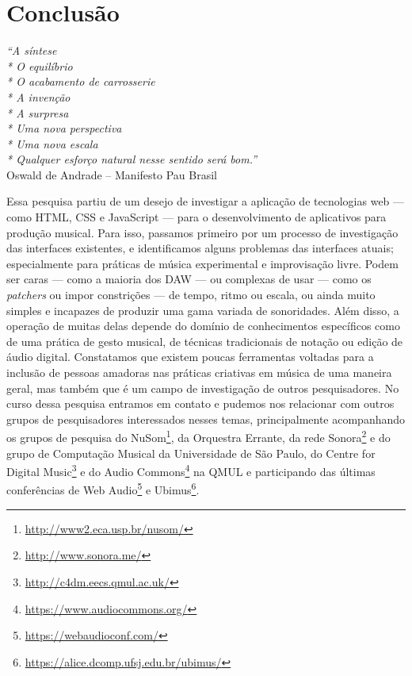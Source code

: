 
\chapter{Conclusão}
\label{ch:conclusao}
\begin{flushright}
\textit{``A síntese\\*
O equilíbrio\\*
O acabamento de carrosserie\\*
A invenção\\*
A surpresa\\*
Uma nova perspectiva\\*
Uma nova escala\\*
Qualquer esforço natural nesse sentido será bom.''} \\
Oswald de Andrade – Manifesto Pau Brasil    
\end{flushright}



Essa pesquisa partiu de um desejo de investigar a aplicação de tecnologias web --- como HTML, CSS e JavaScript --- para o desenvolvimento de aplicativos para produção musical. Para isso, passamos primeiro por um processo de investigação das interfaces existentes, e identificamos alguns problemas das interfaces atuais; especialmente para práticas de música experimental e improvisação livre. Podem ser caras --- como a maioria dos DAW --- ou complexas de usar --- como os \emph{patchers} ou impor constrições --- de tempo, ritmo ou escala, ou ainda muito simples e incapazes de produzir uma gama variada de sonoridades. Além disso, a operação de muitas delas depende do domínio de conhecimentos específicos como de uma prática de gesto musical, de técnicas tradicionais de notação ou edição de áudio digital. Constatamos que existem poucas ferramentas voltadas para a inclusão de pessoas amadoras nas práticas criativas em música de uma maneira geral, mas também que é um campo de investigação de outros pesquisadores. No curso dessa pesquisa entramos em contato e pudemos nos relacionar com outros grupos de pesquisadores interessados nesses temas, principalmente acompanhando os grupos de pesquisa do NuSom\footnote{\url{http://www2.eca.usp.br/nusom/}}, da Orquestra Errante, da rede Sonora\footnote{\url{http://www.sonora.me/}} e do grupo de Computação Musical da Universidade de São Paulo, do Centre for Digital Music\footnote{\url{http://c4dm.eecs.qmul.ac.uk/}} e do Audio Commons\footnote{\url{https://www.audiocommons.org/}} na QMUL e participando das últimas conferências de Web Audio\footnote{\url{https://webaudioconf.com/}} e Ubimus\footnote{\url{https://alice.dcomp.ufsj.edu.br/ubimus/}}.

